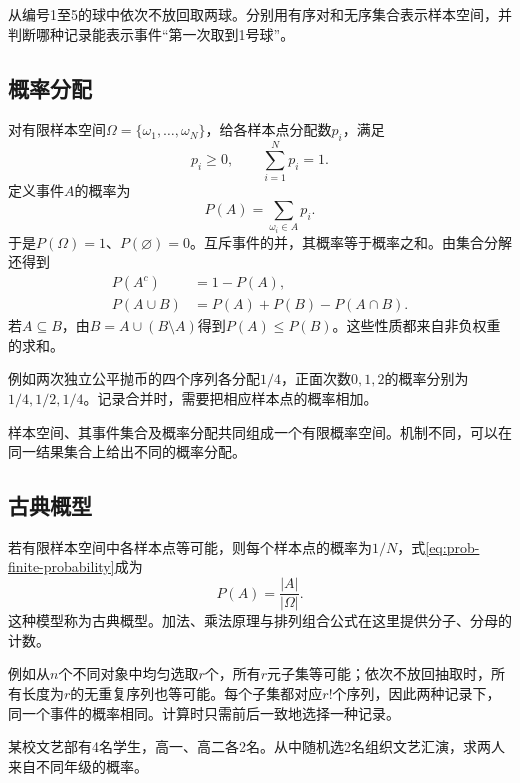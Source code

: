 \begin{example}
从编号1至5的球中依次不放回取两球。分别用有序对和无序集合表示样本空间，并判断哪种记录能表示事件“第一次取到1号球”。
\end{example}

\newpage
\subsection{概率分配}

对有限样本空间\(\Omega=\{\omega_1,\ldots,\omega_N\}\)，给各样本点分配数\(p_i\)，满足
\[
 p_i\ge0,\qquad \sum_{i=1}^N p_i=1.
\]
定义事件\(A\)的{\heiti 概率}为
\begin{equation}\label{eq:prob-finite-probability}
 P(A)=\sum_{\omega_i\in A}p_i.
\end{equation}
于是\(P(\Omega)=1\)、\(P(\varnothing)=0\)。互斥事件的并，其概率等于概率之和。由集合分解还得到
\begin{align}
 P(A^c)&=1-P(A),\label{eq:prob-complement}\\
 P(A\cup B)&=P(A)+P(B)-P(A\cap B).\label{eq:prob-addition}
\end{align}
若\(A\subseteq B\)，由\(B=A\cup(B\setminus A)\)得到\(P(A)\le P(B)\)。这些性质都来自非负权重的求和。

例如两次独立公平抛币的四个序列各分配\(1/4\)，正面次数\(0,1,2\)的概率分别为\(1/4,1/2,1/4\)。记录合并时，需要把相应样本点的概率相加。

样本空间、其事件集合及概率分配共同组成一个{\heiti 有限概率空间}。机制不同，可以在同一结果集合上给出不同的概率分配。

\subsection{古典概型}

若有限样本空间中各样本点等可能，则每个样本点的概率为\(1/N\)，式\eqref{eq:prob-finite-probability}成为
\begin{equation}\label{eq:prob-classical}
 P(A)=\frac{|A|}{|\Omega|}.
\end{equation}
这种模型称为{\heiti 古典概型}。加法、乘法原理与排列组合公式在这里提供分子、分母的计数。

例如从\(n\)个不同对象中均匀选取\(r\)个，所有\(r\)元子集等可能；依次不放回抽取时，所有长度为\(r\)的无重复序列也等可能。每个子集都对应\(r!\)个序列，因此两种记录下，同一个事件的概率相同。计算时只需前后一致地选择一种记录。

\begin{example}
某校文艺部有4名学生，高一、高二各2名。从中随机选2名组织文艺汇演，求两人来自不同年级的概率。
\end{example}

